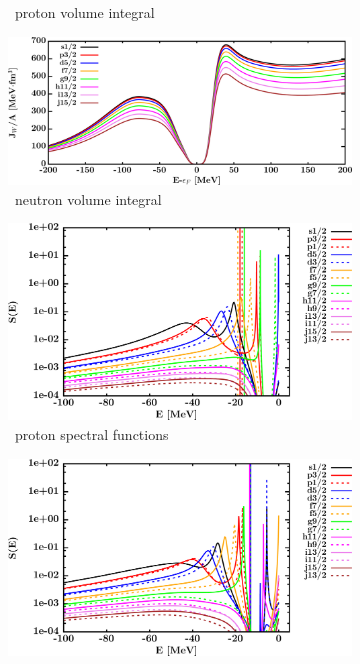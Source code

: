 \begin{figure}[hbtp]
\begin{subfigure}[b]{0.45\textwidth}
        \caption{\snTwelve\ proton volume integral}
        \label{DOMFitData_sn112_proton_potentialIntegral}
    \end{subfigure}\hspace{6pt}
    \begin{subfigure}[b]{0.45\textwidth}
        \centering
        \includegraphics[width=\linewidth]{figures/sn112_neutronVolumeIntegrals.png}
        \caption{\snTwelve\ neutron volume integral}
        \label{DOMFitData_sn112_neutron_potentialIntegral}
    \end{subfigure}\vspace{0.3in}
    \begin{subfigure}[b]{0.45\textwidth}
        \centering
        \includegraphics[width=\linewidth]{figures/sn112_protonSpectralFunctions.png}
        \caption{\snTwelve\ proton spectral functions}
        \label{DOMFitData_sn112_proton_spectralFunctions}
    \end{subfigure}\hspace{6pt}
    \begin{subfigure}[b]{0.45\textwidth}
        \centering
        \includegraphics[width=\linewidth]{figures/sn112_neutronSpectralFunctions.png}

\end{subfigure}
\end{figure}
